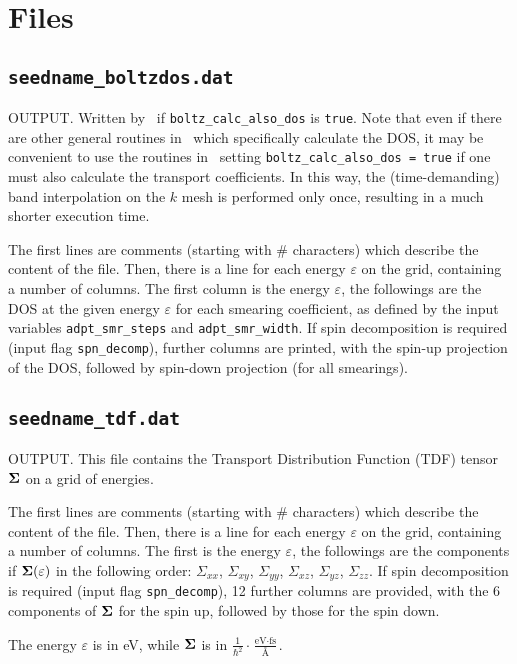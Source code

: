 \section{Files}
\subsection{{\tt seedname\_boltzdos.dat}}
OUTPUT. Written by \postw\ if {\tt boltz\_calc\_also\_dos} is \verb#true#. Note that even if there are other general routines in \postw\ which specifically calculate the DOS, it may be convenient to use the routines in \bw\ setting {\tt boltz\_calc\_also\_dos = true} if one must also calculate the transport coefficients. In this way, the (time-demanding) band interpolation on the $k$ mesh is performed only once, resulting in a much shorter execution time.

The first lines are comments (starting with \# characters) which describe the content of the file.
Then, there is a line for each energy $\varepsilon$ on the grid, containing a number of columns. The first column is the energy $\varepsilon$, the followings are the DOS at the given energy $\varepsilon$ for each smearing coefficient, as defined by the input variables {\tt adpt\_smr\_steps} and {\tt adpt\_smr\_width}.
If spin decomposition is required (input flag {\tt spn\_decomp}), further columns are printed, with the spin-up projection of the DOS, followed by spin-down projection (for all smearings).

\subsection{{\tt seedname\_tdf.dat}}
OUTPUT. This file contains the Transport Distribution Function (TDF) tensor $\bm{\mathrm{\Sigma}}$ on a grid of energies. 

The first lines are comments (starting with \# characters) which describe the content of the file.
Then, there is a line for each energy $\varepsilon$ on the grid, containing a number of columns. The first is the energy $\varepsilon$, the followings are the components if $\bm{\mathrm{\Sigma}}(\varepsilon)$ in the following order: $\Sigma_{xx}$, $\Sigma_{xy}$, $\Sigma_{yy}$, $\Sigma_{xz}$, $\Sigma_{yz}$, $\Sigma_{zz}$. If spin decomposition is required (input flag {\tt spn\_decomp}), 12 further columns are provided, with the 6 components of $\bm{\mathrm{\Sigma}}$ for the spin up, followed by those for the spin down.

The energy $\varepsilon$ is in eV, while $\bm{\mathrm{\Sigma}}$ is in 
 $\displaystyle\frac{1}{\hbar^2}\cdot\frac{\text{eV}\cdot\text{fs}}{\text{\AA}}$.

